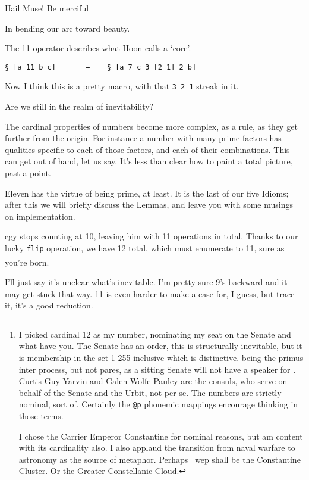 \documentclass[twoside]{article}
\begin{document}
Hail Muse! Be merciful

In bending our arc toward beauty.

The 11 operator describes what Hoon calls a `core'.

\begin{lstlisting}[style=listingblock]
§ [a 11 b c]       →    § [a 7 c 3 [2 1] 2 b]
\end{lstlisting}

Now I think this is a pretty macro, with that \texttt{3 2 1} streak in it.

Are we still in the realm of inevitability?

The cardinal properties of numbers become more complex, as a rule, as they get further from the origin. For instance a number with many prime factors has qualities specific to each of those factors, and each of their combinations. This can get out of hand, let us say. It's less than clear how to paint a total picture, past a point.

Eleven has the virtue of being prime, at least. It is the last of our five Idioms; after this we will briefly discuss the Lemmas, and leave you with some musings on implementation.

cgy stops counting at 10, leaving him with 11 operations in total. Thanks to our lucky \texttt{flip} operation, we have 12 total, which must enumerate to 11, sure as you're born.\footnote{I picked cardinal 12 as my number, nominating my seat on the Senate and what have you. The Senate has an order, this is structurally inevitable, but it is membership in the set 1-255 inclusive which is distinctive.  being the primus inter process, but not pares, as a sitting Senate will not have a speaker for . Curtis Guy Yarvin and Galen Wolfe-Pauley are the consuls, who serve on behalf of the Senate and the Urbit, not  per se. The numbers are strictly nominal, sort of. Certainly the \texttt{@p} phonemic mappings encourage thinking in those terms.

I chose the Carrier Emperor Constantine for nominal reasons, but am content with its cardinality also. I also applaud the transition from naval warfare to astronomy as the source of metaphor. Perhaps ~wep shall be the Constantine Cluster. Or the Greater Constellanic Cloud.}

I'll just say it's unclear what's inevitable. I'm pretty sure 9's backward and it may get stuck that way. 11 is even harder to make a case for, I guess, but trace it, it's a good reduction.
\end{document}
